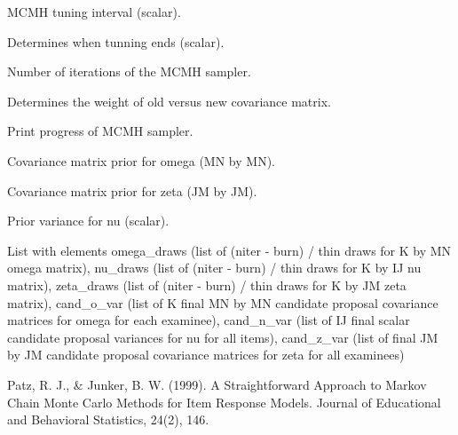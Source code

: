\documentclass[a4paper]{book}
\begin{document}
\begin{Arguments}
\begin{ldescription}
\item[\code{tune\_int}] MCMH tuning interval (scalar).

\item[\code{max\_tune}] Determines when tunning ends (scalar).

\item[\code{niter}] Number of iterations of the MCMH sampler.

\item[\code{weight}] Determines the weight of old versus new covariance matrix.

\item[\code{verbose\_mcmh}] Print progress of MCMH sampler.

\item[\code{omega\_sigma}] Covariance matrix prior for omega (MN by MN).

\item[\code{zeta\_sigma@}] Covariance matrix prior for zeta (JM by JM).

\item[\code{nu\_sigma@}] Prior variance for nu (scalar).
\end{ldescription}
\end{Arguments}
%
\begin{Value}
List with elements omega\_draws (list of (niter - burn) / thin draws
for K by MN omega matrix), nu\_draws (list of (niter - burn) / thin draws
for K by IJ nu matrix), zeta\_draws (list of (niter - burn) / thin draws for K
by JM zeta matrix), cand\_o\_var (list of K final MN by MN candidate proposal
covariance matrices for omega for each examinee), cand\_n\_var (list of IJ
final scalar candidate proposal variances for nu for all items), cand\_z\_var
(list of final JM by JM candidate proposal covariance matrices for zeta for
all examinees)
\end{Value}
%
\begin{References}\relax
Patz, R. J., \& Junker, B. W. (1999). A Straightforward Approach to Markov
Chain Monte Carlo Methods for Item Response Models. Journal of Educational
and Behavioral Statistics, 24(2), 146.
\end{References}
%
\begin{Examples}
\end{Examples}
\end{document}
